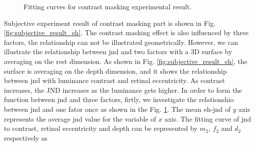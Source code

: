 \documentclass[journal]{IEEEtran}
\begin{document}
\begin{figure}[!t]
	\caption{Fitting curves for contrast masking experimental result.}
	\label{fig:curve_fitting_eh}
\end{figure}
Subjective experiment result of contrast masking part is shown in Fig. \ref{fig:subjective_result_eh}. The contrast masking effect is also influenced by three factors, the relationship can not be illustrated geometrically. However, we can illustrate the relationship between jnd and two factors with a 3D surface by averaging on the rest dimension. As shown in Fig. \ref{fig:subjective_result_eh}, the surface is averaging on the depth dimension, and it shows the relationship between jnd with luminance contrast and retinal eccentricity. As contrast increases, the JND increases as the luminance gets higher. In order to form the function between jnd and three factors, firtly, we investigate the relationshio between jnd and one fator once as shown in the Fig. \ref{fig:curve_fitting_eh}. The mean eh-jnd of $y$ axis represents the average jnd value for the variable of $x$ axis. The fitting curve of jnd to contrast, retinal eccentricity and depth can be represented by $m_2$, $f_2$ and $d_2$ respectively as
\end{document}
